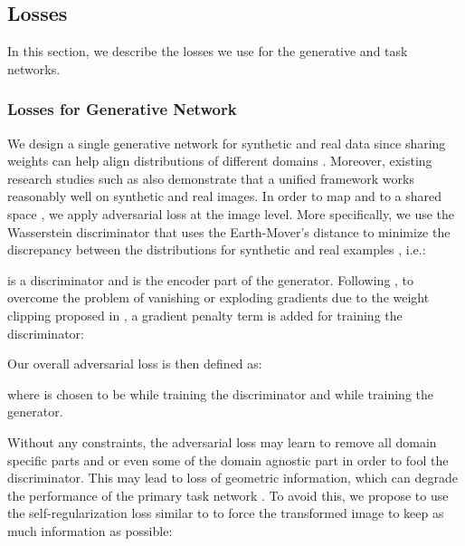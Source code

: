 \documentclass[10pt,twocolumn,letterpaper]{article}
\begin{document}
\subsection{Losses}
In this section, we describe the losses we use for the generative and task networks. 
\subsubsection{Losses for Generative Network}
We design a single generative network  for synthetic and real data since sharing weights can help align distributions of different domains \cite{CoGAN}.
Moreover, existing research studies such as \cite{NeuralFace, SfSNet} also demonstrate that a unified framework works reasonably well on synthetic and real images.
In order to map  and  to a shared space , we apply adversarial loss \cite{GAN} at the image level.
More specifically, we use the Wasserstein discriminator \cite{WGAN} that uses the Earth-Mover's distance to minimize the discrepancy between the distributions for synthetic and real examples , i.e.:

 is a discriminator and  is the encoder part of the generator. 
Following \cite{WGANGP}, to overcome the problem of vanishing or exploding gradients due to the weight clipping proposed in \cite{WGAN}, a gradient penalty term is added for training the discriminator: 

Our overall adversarial loss is then defined as:

where  is chosen to be  while training the discriminator and  while training the generator.

Without any constraints, the adversarial loss may learn to remove all domain specific parts  and  or even some of the domain agnostic part  in order to fool the discriminator.
This may lead to loss of geometric information, which can degrade the performance of the primary task network .
To avoid this, we propose to use the self-regularization loss similar to \cite{SimGAN} to force the transformed image to keep as much information as possible:
\end{document}
